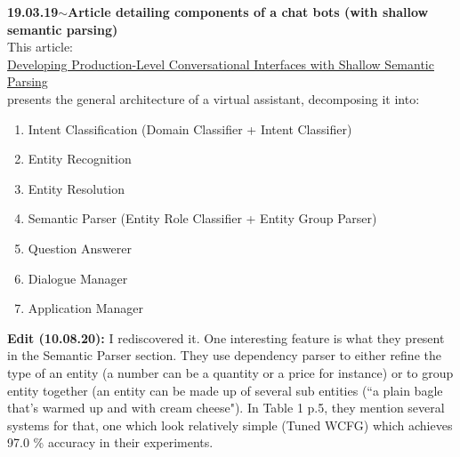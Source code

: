 \documentclass[11pt,a4paper]{article}
\newenvironment{loggentry}[2]%
{\noindent\textbf{#1}\hspace{1cm}$\mathbf{\sim}$\text{ }\textbf{#2}\\}{\vspace{0.5cm}}
\begin{document}
\begin{loggentry}{19.03.19}{Article detailing components of a chat bots (with shallow semantic parsing)}

This article:\\
\href{http://aclweb.org/anthology/D18-2027}{Developing Production-Level Conversational Interfaces with Shallow Semantic Parsing}\\
presents the general architecture of a virtual assistant, decomposing it into:
\begin{enumerate}
\item Intent Classification (Domain Classifier + Intent Classifier)
\item Entity Recognition
\item Entity Resolution
\item Semantic Parser (Entity Role Classifier + Entity Group Parser)
\item Question Answerer
\item Dialogue Manager
\item Application Manager
\end{enumerate}

\textbf{Edit (10.08.20):} I rediscovered it. One interesting feature is what they present in the Semantic Parser section. They use dependency parser to either refine the type of an entity (a number can be a quantity or a price for instance) or to group entity together (an entity can be made up of several sub entities (``a plain bagle that's warmed up and with cream cheese"). In Table 1 p.5, they mention several systems for that, one which look relatively simple (Tuned WCFG) which achieves 97.0 \% accuracy in their experiments.

\end{loggentry}
\end{document}
